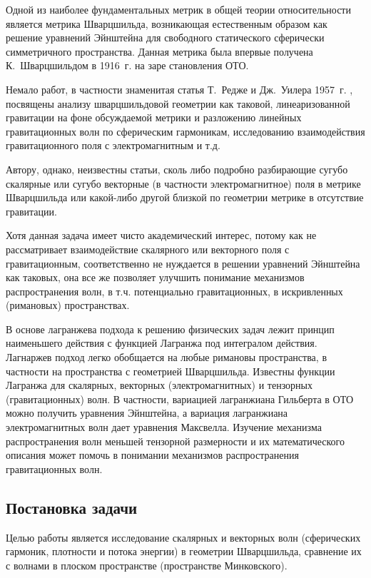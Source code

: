 \documentclass[\docroot/reports/draft/report.tex]{subfiles}
\begin{document}
\onlyinsubfile{\tableofcontents}

Одной из наиболее фундаментальных метрик в общей теории относительности является метрика Шварцшильда, возникающая естественным образом как решение уравнений Эйнштейна для свободного статического сферически симметричного пространства. Данная метрика была впервые получена К.~Шварцшильдом в 1916~г. \cite{schwarzschild_free_space_rus} на заре становления ОТО.

Немало работ, в частности знаменитая статья Т.~Редже и Дж.~Уилера 1957~г. \cite{regge_wheeler_1957}, посвящены анализу шварцшильдовой геометрии как таковой, линеаризованной гравитации на фоне обсуждаемой метрики и разложению линейных гравитационных волн по сферическим гармоникам, исследованию взаимодействия гравитационного поля с электромагнитным и т.д.

Автору, однако, неизвестны статьи, сколь либо подробно разбирающие сугубо скалярные или сугубо векторные (в частности электромагнитное) поля в метрике Шварцшильда или какой-либо другой близкой по геометрии метрике в отсутствие гравитации.

Хотя данная задача имеет чисто академический интерес, потому как не рассматривает взаимодействие скалярного или векторного поля с гравитационным, соответственно не нуждается в решении уравнений Эйнштейна как таковых, она все же позволяет улучшить понимание механизмов распространения волн, в т.ч. потенциально гравитационных, в искривленных (римановых) пространствах.

В основе лагранжева подхода к решению физических задач лежит принцип наименьшего действия с функцией Лагранжа под интегралом действия. Лагнаржев подход легко обобщается на любые римановы пространства, в частности на пространства с геометрией Шварцшильда. Известны функции Лагранжа для скалярных, векторных (электромагнитных) и тензорных (гравитационных) волн. В частности, вариацией лагранжиана Гильберта в ОТО можно получить уравнения Эйнштейна, а вариация лагранжиана электромагнитных волн дает уравнения Максвелла. Изучение механизма распространения волн меньшей тензорной размерности и их математического описания может помочь в понимании механизмов распространения гравитационных волн.

\subsection{Постановка задачи}

Целью работы является исследование скалярных и векторных волн (сферических гармоник, плотности и потока энергии) в геометрии Шварцшильда, сравнение их с волнами в плоском пространстве (пространстве Минковского).
\end{document}
